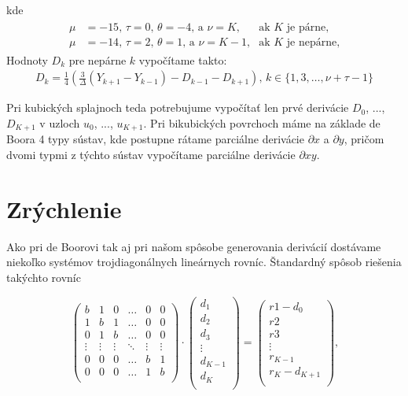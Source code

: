 \documentclass{rnthesis}
\begin{document}
kde 
\begin{gather} \label{eq:reducedOddD}
\begin{aligned}
\mu &= -15\text{, }\tau = 0\text{, }\theta = -4\text{, a }\nu = K \text{,}&\text{ak }K\text{ je párne,}\\
\mu &= -14\text{, }\tau = 2\text{, }\theta = 1\text{, a }\nu = K - 1 \text{,}&\text{ak }K\text{ je nepárne,}
\end{aligned}
\end{gather}
Hodnoty $D_k$ pre nepárne $k$ vypočítame takto:
\begin{multline} \label{eq:reducedR}
D_k = \frac{1}{4}\left(\frac{3}{\Delta}(Y_{k+1} - Y_{k-1}) - D_{k-1} - D_{k+1}\right)\text{, } k \in \{1, 3, \dots, \nu + \tau - 1\}
\end{multline}

Pri kubických splajnoch teda potrebujume vypočítať len prvé derivácie $D_0$, ..., $D_{K+1}$ v uzloch $u_0$, ..., $u_{K+1}$. 
Pri bikubických povrchoch máme na základe de Boora 4 typy sústav, kde postupne rátame parciálne derivácie $\partial x$ a $\partial y$, pričom dvomi typmi z týchto sústav vypočítame parciálne derivácie $\partial xy$. 

\section*{Zrýchlenie}

Ako pri de Boorovi tak aj pri našom spôsobe generovania derivácií dostávame niekoľko systémov trojdiagonálnych lineárnych rovníc. Štandardný spôsob riešenia takýchto rovníc

\begin{equation}
\begin{pmatrix}
b & 1 & 0 & \hdots & 0 & 0\\
1 & b & 1 & \hdots & 0 & 0\\
0 & 1 & b & \hdots & 0 & 0\\
\vdots & \vdots & \vdots & \ddots & \vdots & \vdots\\
0 & 0 & 0 & \hdots & b & 1 \\
0 & 0 & 0 & \hdots & 1 & b\\
\end{pmatrix} 
\cdot
\begin{pmatrix}
d_1\\
d_2\\
d_3\\
\vdots \\
d_{K-1}\\
d_{K}\\
\end{pmatrix}
=
\begin{pmatrix}
r1 - d_0\\
r2\\
r3\\
\vdots \\
r_{K-1}\\
r_K - d_{K+1}\\
\end{pmatrix}\text{,}
\end{equation}
\end{document}
